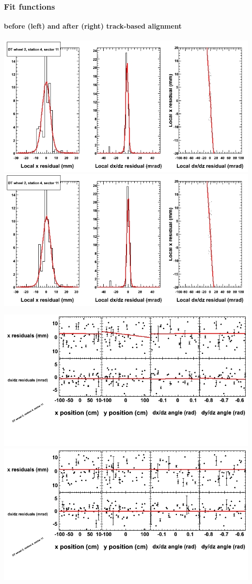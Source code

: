 \documentclass[compress]{beamer}
\begin{document}
\begin{frame}
\frametitle{Fit functions}
\framesubtitle{before (left) and after (right) track-based alignment}
\includegraphics[width=0.5\linewidth]{fitfunctions_re01/MBwhEst4sec11_bellcurves.png} \includegraphics[width=0.5\linewidth]{fitfunctions_re05/MBwhEst4sec11_bellcurves.png}

\includegraphics[width=0.5\linewidth]{fitfunctions_re01/MBwhEst4sec11_polynomials.png} \includegraphics[width=0.5\linewidth]{fitfunctions_re05/MBwhEst4sec11_polynomials.png}
\end{frame}
\end{document}
